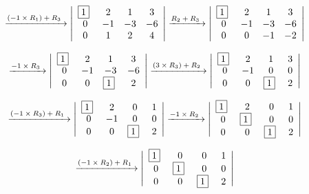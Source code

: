 \documentclass{article}
\begin{document}
\[
\xrightarrow[]{\text{$ (-1 \times R\textsubscript{1}) + R\textsubscript{3} $~}}
\left| \begin{array}{cccc}
$\boxed{1}$~ & 2 & 1 & 3 \\
0 & -1 & -3 & -6 \\
0 & 1 & 2 & 4 \\
\end{array} \right|
\xrightarrow[]{\text{$ R\textsubscript{2} + R\textsubscript{3} $~}}
\left| \begin{array}{cccc}
$\boxed{1}$~ & 2 & 1 & 3 \\
0 & -1 & -3 & -6 \\
0 & 0 & -1 & -2 \\
\end{array} \right|
\]

\[
\xrightarrow[]{\text{$ -1 \times R\textsubscript{3} $~}}
\left| \begin{array}{cccc}
$\boxed{1}$~ & 2 & 1 & 3 \\
0 & -1 & -3 & -6 \\
0 & 0 & $\boxed{1}$~ & 2 \\
\end{array} \right|
\xrightarrow[]{\text{$ (3 \times R\textsubscript{3}) + R\textsubscript{2} $~}}
\left| \begin{array}{cccc}
$\boxed{1}$~ & 2 & 1 & 3 \\
0 & -1 & 0 & 0 \\
0 & 0 & $\boxed{1}$~ & 2 \\
\end{array} \right|
\]

\[
\xrightarrow[]{\text{$ (-1 \times R\textsubscript{3}) + R\textsubscript{1} $~}}
\left| \begin{array}{cccc}
$\boxed{1}$~ & 2 & 0 & 1 \\
0 & -1 & 0 & 0 \\
0 & 0 & $\boxed{1}$~ & 2 \\
\end{array} \right|
\xrightarrow[]{\text{$ -1 \times R\textsubscript{2} $~}}
\left| \begin{array}{cccc}
$\boxed{1}$~ & 2 & 0 & 1 \\
0 & $\boxed{1}$~ & 0 & 0 \\
0 & 0 & $\boxed{1}$~ & 2 \\
\end{array} \right|
\]

\[
\xrightarrow[]{\text{$ (-1 \times R\textsubscript{2}) + R\textsubscript{1} $~}}
\left| \begin{array}{cccc}
$\boxed{1}$~ & 0 & 0 & 1 \\
0 & $\boxed{1}$~ & 0 & 0 \\
0 & 0 & $\boxed{1}$~ & 2 \\
\end{array} \right|
\]
\end{document}
